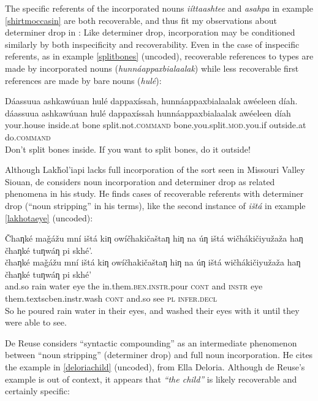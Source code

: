 \documentclass[output=paper]{LSP/langsci}
\begin{document}
	The specific referents of the incorporated nouns \emph{iíttaashtee} and \emph{asahpa} in example \ref{shirtmoccasin} are both recoverable, and thus fit my observations about determiner drop in : Like determiner drop, incorporation may be conditioned similarly by both inspecificity and recoverability. Even in the case of inspecific referents, as in example \ref{splitbones} (uncoded), recoverable references to types are made by incorporated nouns (\emph{‎hunnáappaxbialaalak}) while less recoverable first references are made by bare nouns (\emph{hulé}):
	 
\ea\label{splitbones}
 	Dáassuua ashkawúuan hulé dappaxíssah, hunnáappaxbialaalak awéeleen díah.\footnotemark\\
\gll	dáassuua		ashkawúuan		hulé		dappaxíssah				hunnáappaxbialaalak			awéeleen		díah\\
	your.house		inside.at		bone		split.not.\textsc{command}	bone.you.split.\textsc{mod}.you.if	outside.at		do.\textsc{command}\\
\glt	Don’t split bones inside. If you want to split bones, do it outside! 
\z

	Although Lakȟol’iapi lacks full incorporation of the sort seen in Missouri Valley Siouan, de \citet{Reuse1994} considers noun incorporation and determiner drop as related phenomena in his study. He finds cases of recoverable referents with determiner drop (“noun stripping” in his terms), like the second instance of \emph{ištá} in example \ref{lakhotaeye} (uncoded):
	
\ea\label{lakhotaeye}
 	Čhaƞké maǧážu mní ištá kiƞ owíčhakičaštaƞ hiƞ na úƞ ištá wičhákičiyužaža haƞ čhaƞké tuƞwáƞ pi skhé’.\footnotemark\\
\gll	čhaƞké	maǧážu	mní	ištá	kiƞ	owíčhakičaštaƞ			hiƞ			na	úƞ			ištá		wičhákičiyužaža			haƞ			čhaƞké		tuƞwáƞ	pi		skhé’\\
	and.so	rain		water	eye	the	in.them.\textsc{ben.instr}.pour	\textsc{cont}	and	\textsc{instr}	eye		them.textsc{ben.instr}.wash	\textsc{cont}	and.so	see		\textsc{pl}	\textsc{infer.decl}\\
\glt	So he poured rain water in their eyes, and washed their eyes with it until they were able to see.
\z

De Reuse considers “syntactic compounding” as an intermediate phenomenon between “noun stripping” (determiner drop) and full noun incorporation. He cites the example in \ref{deloriachild} (uncoded), from Ella Deloria. Although de Reuse’s example is out of context, it appears that \emph{“the child”} is likely recoverable and certainly specific:
\end{document}
